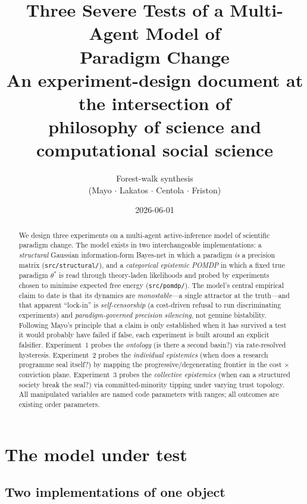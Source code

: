 \documentclass[11pt]{article}
\title{\textbf{Three Severe Tests of a Multi-Agent Model of\\ Paradigm Change}\\[4pt]
\large An experiment-design document at the intersection of\\
philosophy of science and computational social science}
\author{Forest-walk synthesis \\ \small (Mayo $\cdot$ Lakatos $\cdot$ Centola $\cdot$ Friston)}
\date{2026-06-01}
\newcommand{\code}[1]{\texttt{#1}}
\newcommand{\thetastar}{\theta^{\!*}}
\begin{document}
\maketitle

\begin{abstract}
\noindent
We design three experiments on a multi-agent active-inference model of scientific
paradigm change. The model exists in two interchangeable implementations: a
\emph{structural} Gaussian information-form Bayes-net in which a paradigm \emph{is}
a precision matrix (\code{src/structural/}), and a \emph{categorical epistemic
POMDP} in which a fixed true paradigm $\thetastar$ is read through theory-laden
likelihoods and probed by experiments chosen to minimise expected free energy
(\code{src/pomdp/}). The model's central empirical claim to date is that its
dynamics are \emph{monostable}---a single attractor at the truth---and that
apparent ``lock-in'' is \emph{self-censorship} (a cost-driven refusal to run
discriminating experiments) and \emph{paradigm-governed precision silencing},
not genuine bistability. Following Mayo's principle that a claim is only
established when it has survived a test it would probably have failed if false,
each experiment is built around an explicit falsifier. Experiment~1 probes the
\emph{ontology} (is there a second basin?) via rate-resolved hysteresis.
Experiment~2 probes the \emph{individual epistemics} (when does a research
programme seal itself?) by mapping the progressive/degenerating frontier in the
cost $\times$ conviction plane. Experiment~3 probes the \emph{collective
epistemics} (when can a structured society break the seal?) via committed-minority
tipping under varying trust topology. All manipulated variables are named code
parameters with ranges; all outcomes are existing order parameters.
\end{abstract}

\tableofcontents

\section{The model under test}
\label{sec:model}

\subsection{Two implementations of one object}
\end{document}
